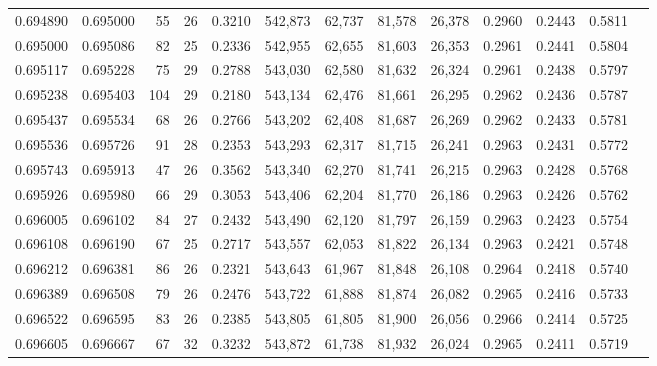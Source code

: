 \begin{tabular}{rrrrrrrrrrrrr}
0.694890 & 0.695000 &     55 &    26 &                                     0.3210 & 542,873 &  62,737 &  81,578 &  26,378 & 0.2960 & 0.2443 & 0.5811 \\
0.695000 & 0.695086 &     82 &    25 &                                     0.2336 & 542,955 &  62,655 &  81,603 &  26,353 & 0.2961 & 0.2441 & 0.5804 \\
0.695117 & 0.695228 &     75 &    29 &                                     0.2788 & 543,030 &  62,580 &  81,632 &  26,324 & 0.2961 & 0.2438 & 0.5797 \\
0.695238 & 0.695403 &    104 &    29 &                                     0.2180 & 543,134 &  62,476 &  81,661 &  26,295 & 0.2962 & 0.2436 & 0.5787 \\
0.695437 & 0.695534 &     68 &    26 &                                     0.2766 & 543,202 &  62,408 &  81,687 &  26,269 & 0.2962 & 0.2433 & 0.5781 \\
0.695536 & 0.695726 &     91 &    28 &                                     0.2353 & 543,293 &  62,317 &  81,715 &  26,241 & 0.2963 & 0.2431 & 0.5772 \\
0.695743 & 0.695913 &     47 &    26 &                                     0.3562 & 543,340 &  62,270 &  81,741 &  26,215 & 0.2963 & 0.2428 & 0.5768 \\
0.695926 & 0.695980 &     66 &    29 &                                     0.3053 & 543,406 &  62,204 &  81,770 &  26,186 & 0.2963 & 0.2426 & 0.5762 \\
0.696005 & 0.696102 &     84 &    27 &                                     0.2432 & 543,490 &  62,120 &  81,797 &  26,159 & 0.2963 & 0.2423 & 0.5754 \\
0.696108 & 0.696190 &     67 &    25 &                                     0.2717 & 543,557 &  62,053 &  81,822 &  26,134 & 0.2963 & 0.2421 & 0.5748 \\
0.696212 & 0.696381 &     86 &    26 &                                     0.2321 & 543,643 &  61,967 &  81,848 &  26,108 & 0.2964 & 0.2418 & 0.5740 \\
0.696389 & 0.696508 &     79 &    26 &                                     0.2476 & 543,722 &  61,888 &  81,874 &  26,082 & 0.2965 & 0.2416 & 0.5733 \\
0.696522 & 0.696595 &     83 &    26 &                                     0.2385 & 543,805 &  61,805 &  81,900 &  26,056 & 0.2966 & 0.2414 & 0.5725 \\
0.696605 & 0.696667 &     67 &    32 &                                     0.3232 & 543,872 &  61,738 &  81,932 &  26,024 & 0.2965 & 0.2411 & 0.5719 \\

\end{tabular}
